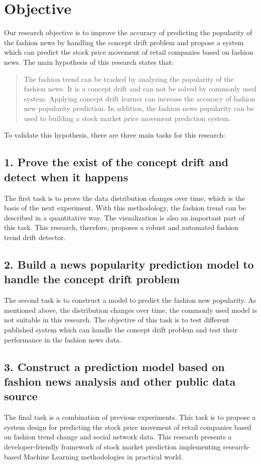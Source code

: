 \section{Objective}
Our research objective is to improve the accuracy of predicting the popularity of the fashion news by handling the concept drift problem and propose a system which can predict the stock price movement of retail companies based on fashion news. The main hypothesis of this research states that:

\begin{quote}
The fashion trend can be tracked by analyzing the popularity of the fashion news. It is a concept drift and can not be solved by commonly used system. Applying concept drift learner can increase the accuracy of fashion new popularity prediction. In addition, the fashion news popularity can be used to building a stock market price movement prediction system.
\end{quote}

To validate this hypothesis, there are three main tasks for this research:

\subsection*{1. Prove the exist of the concept drift and detect when it happens}
The first task is to prove the data distribution changes over time, which is the basis of the next experiment. With this methodology, the fashion trend can be described in a quantitative way. The visualization is also an important part of this task. This research, therefore, proposes a robust and automated fashion trend drift detector. 

\subsection*{2. Build a news popularity prediction model to handle the concept drift problem}
The second task is to construct a model to predict the fashion new popularity. As mentioned above, the distribution changes over time, the commonly used model is not suitable in this research. The objective of this task is to test different published system which can handle the concept drift problem and test their performance in the fashion news data. 

\subsection*{3. Construct a prediction model based on fashion news analysis and other public data source}
The final task is a combination of previous experiments. This task is to propose a system design for predicting the stock price movement of retail companies based on fashion trend change and social network data. This research presents a developer-friendly framework of stock market prediction implementing research-based Machine Learning methodologies in practical world.

